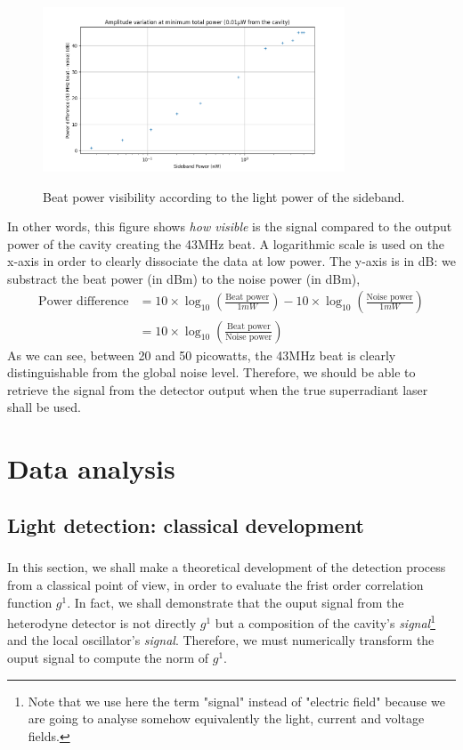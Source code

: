 \documentclass[10pt]{report}
\begin{document}
\begin{figure}[h!]
\caption{Beat power visibility according to the light power of the sideband.}
\centering
\includegraphics[width=0.8\textwidth]{sb-power-visibility}
\label{fig:sb-power-visibility}
\end{figure}

In other words, this figure shows \textit{how visible} is the signal compared to the output power of the cavity creating the 43MHz beat. A logarithmic scale is used on the x-axis in order to clearly dissociate the data at low power. The y-axis is in dB: we substract the beat power (in dBm) to the noise power (in dBm),
\begin{align}
\textrm{Power difference} &= 10 \times \log_{10}\left( \frac{\textrm{Beat power}}{1mW} \right) - 10 \times \log_{10}\left( \frac{\textrm{Noise power}}{1mW} \right) \\
&= 10 \times \log_{10}\left( \frac{\textrm{Beat power}}{\textrm{Noise power}} \right)
\end{align}
As we can see, between 20 and 50 picowatts, the 43MHz beat is clearly distinguishable from the global noise level. Therefore, we should be able to retrieve the signal from the detector output when the true superradiant laser shall be used.

\chapter{Data analysis}
\section{Light detection: classical development}
\paragraph{}

In this section, we shall make a theoretical development of the detection process from a classical point of view, in order to evaluate the frist order correlation function $g^1$. In fact, we shall demonstrate that the ouput signal from the heterodyne detector is not directly $g^1$ but a composition of the cavity's \textit{signal}\footnote{Note that we use here the term "signal" instead of "electric field" because we are going to analyse somehow equivalently the light, current and voltage fields.} and the local oscillator's \textit{signal}. Therefore, we must numerically transform the ouput signal to compute the norm of $g^1$.
\end{document}

